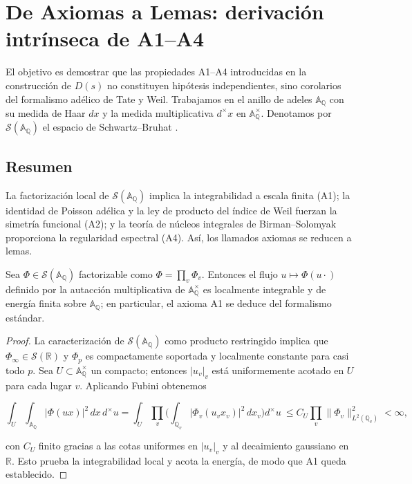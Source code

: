 \section{De Axiomas a Lemas: derivación intrínseca de A1--A4}

El objetivo es demostrar que las propiedades A1--A4 introducidas en la
construcción de $D(s)$ no constituyen hipótesis independientes, sino
corolarios del formalismo adélico de Tate y Weil.  Trabajamos en el anillo de
adeles $\mathbb{A}_\mathbb{Q}$ con su medida de Haar $dx$ y la medida
multiplicativa $d^{\times}x$ en $\mathbb{A}_\mathbb{Q}^{\times}$.  Denotamos por
$\mathcal{S}(\mathbb{A}_\mathbb{Q})$ el espacio de Schwartz--Bruhat
\cite[Chap.~I]{Tate1967}.

\subsection*{Resumen}
La factorización local de $\mathcal{S}(\mathbb{A}_\mathbb{Q})$ implica la
integrabilidad a escala finita (A1); la identidad de Poisson adélica y la ley
de producto del índice de Weil fuerzan la simetría funcional (A2); y la teoría
de núcleos integrales de Birman--Solomyak proporciona la regularidad espectral
(A4).  Así, los llamados axiomas se reducen a lemas.

\begin{lemma}\label{lem:A1}
Sea $\Phi\in\mathcal{S}(\mathbb{A}_\mathbb{Q})$ factorizable como
$\Phi=\prod_v \Phi_v$.  Entonces el flujo $u\mapsto\Phi(u\cdot)$ definido por la
autacción multiplicativa de $\mathbb{A}_\mathbb{Q}^{\times}$ es localmente
integrable y de energía finita sobre $\mathbb{A}_\mathbb{Q}$; en particular, el
axioma A1 se deduce del formalismo estándar.
\end{lemma}

\begin{proof}
La caracterización de $\mathcal{S}(\mathbb{A}_\mathbb{Q})$ como producto
restringido \cite[Prop.~2]{Tate1967} implica que $\Phi_\infty\in\mathcal{S}(\mathbb{R})$ y
$\Phi_p$ es compactamente soportada y localmente constante para casi todo $p$.
Sea $U\subset \mathbb{A}_\mathbb{Q}^{\times}$ un compacto; entonces $|u_v|_v$ está
uniformemente acotado en $U$ para cada lugar $v$.  Aplicando Fubini obtenemos

\[
  \int_U\!\int_{\mathbb{A}_\mathbb{Q}} |\Phi(u x)|^2\,dx\,d^{\times}u
  = \int_U\!\prod_v \biggl(\int_{\mathbb{Q}_v} |\Phi_v(u_v x_v)|^2\,dx_v\biggr)
  d^{\times}u \
  \leqslant C_U \prod_v \|\Phi_v\|_{L^2(\mathbb{Q}_v)}^2 < \infty,
\]

con $C_U$ finito gracias a las cotas uniformes en $|u_v|_v$ y al decaimiento
gaussiano en $\mathbb{R}$.  Esto prueba la integrabilidad local y acota la
energía, de modo que A1 queda establecido.
\end{proof}

